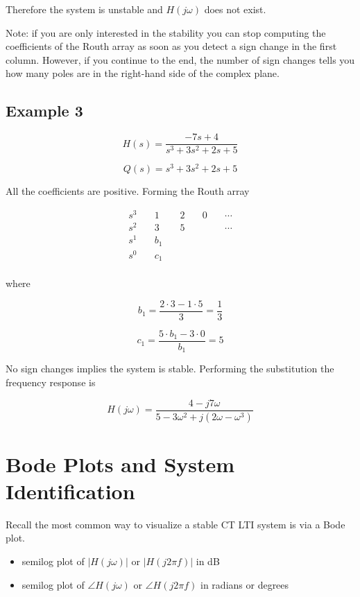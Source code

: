 \documentclass{article}
\begin{document}
Therefore the system is unstable and $H(j\omega)$ does not exist.

Note: if you are only interested in the stability you can stop computing the coefficients of the Routh array as soon as you detect a sign change in the first column. However, if you continue to the end, the number of sign changes tells you how many poles are in the right-hand side of the complex plane.

\subsection{Example 3}

\[
H(s) = \frac{-7s+4}{s^3 + 3s^2 + 2s + 5}
\]

\[
Q(s) = s^3 + 3s^2 + 2s + 5
\]

All the coefficients are positive. Forming the Routh array

\begin{align*}
  s^3 &\quad 1 &\quad 2 &\quad 0 &\quad \cdots\\
  s^2 &\quad 3 &\quad 5 &\quad &\quad \cdots\\
  s^1 &\quad b_1 &\quad  &\quad  &\quad \\
  s^0 &\quad c_1 &\quad  &\quad  &\quad \\
\end{align*}

where

\[
b_1 = \frac{2\cdot 3 - 1\cdot 5}{3} = \frac{1}{3}
\]

\[
c_1 = \frac{5\cdot b_1 - 3\cdot 0}{b_1} = 5
\]

No sign changes implies the system is stable. Performing the substitution the frequency response is

\[
H(j\omega) = \frac{4-j7\omega}{5 - 3\omega^2 + j(2\omega - \omega^3)}
\]
  
\section{Bode Plots and System Identification}

Recall the most common way to visualize a stable CT LTI system is via a Bode plot.

\begin{itemize}
\item semilog plot of $|H(j\omega)|$ or $|H(j2\pi f)|$ in dB
\item semilog plot of $\angle H(j\omega)$ or $\angle H(j2\pi f)$ in radians or degrees
\end{itemize}
\end{document}
